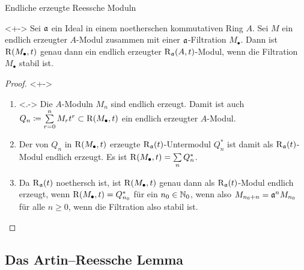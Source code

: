 \begin{frame}{Endliche erzeugte Reessche Moduln}
	\begin{proposition}<+->
		Sei \(\mathfrak{a}\) ein Ideal in einem noetherschen kommutativen Ring
		\(A\). Sei \(M\) ein endlich erzeugter \(A\)-Modul zusammen mit einer
		\(\mathfrak{a}\)-Filtration \(M_\bullet\). Dann ist
		\(\operatorname{R}(M_\bullet, t)\) genau dann ein endlich erzeugter \(\operatorname{R}_{\mathfrak{a}}(A, t)\)-Modul,
		wenn die Filtration \(M_\bullet\) stabil ist.
	\end{proposition}
	\begin{proof}<+->
		\begin{enumerate}[<+->]
		\item<.->
			Die \(A\)-Moduln \(M_n\) sind endlich erzeugt. Damit ist auch
			\(Q_n \coloneqq \sum\limits_{r = 0}^n M_r t^r \subset \operatorname{R}(M_\bullet, t)\)
			ein endlich erzeugter \(A\)-Modul.
		\item
			Der von \(Q_n\) in \(\operatorname{R}(M_\bullet, t)\) erzeugte \(\operatorname{R}_{\mathfrak{a}}(t)\)-Untermodul
			\(Q^*_n\) ist damit als \(\operatorname{R}_{\mathfrak{a}}(t)\)-Modul endlich erzeugt.
			Es ist \(\operatorname{R}(M_\bullet, t) = \sum\limits_n Q^*_n\).
		\item
			Da \(\operatorname{R}_{\mathfrak{a}}(t)\) noethersch ist, ist \(\operatorname{R}(M_\bullet, t)\)
			genau dann als \(\operatorname{R}_{\mathfrak{a}}(t)\)-Modul endlich erzeugt, wenn
			\(\operatorname{R}(M_\bullet, t) = Q^*_{n_0}\) für ein \(n_0 \in \mathbb N_0\), wenn also
			\(M_{n_0 + n} = \mathfrak{a}^n M_{n_0}\) für alle \(n \ge 0\), wenn
			die Filtration also stabil ist.
			\qedhere
		\end{enumerate}
	\end{proof}
\end{frame}

\subsection{Das Artin--Reessche Lemma}

